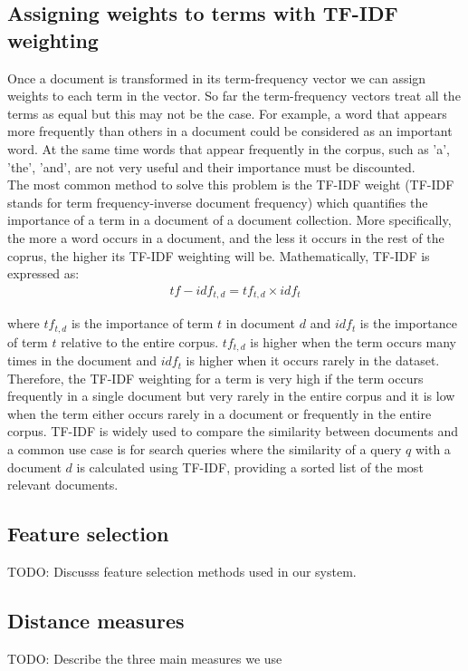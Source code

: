 \subsection{Assigning weights to terms with TF-IDF weighting}
Once a document is transformed in its term-frequency vector we can assign weights to each term in the vector. So far the term-frequency vectors treat 
all the terms as equal but this may not be the case. For example, a word that appears more frequently than others in a document could be considered as an 
important word. At the same time words that appear frequently in the corpus, such as 'a', 'the', 'and', are not very useful and their 
importance must be discounted. \\
The most common method to solve this problem is the TF-IDF weight (TF-IDF stands for term frequency-inverse document frequency) which quantifies the importance of a term in a document of a document collection. More specifically, the more a word occurs in a document, and the less it occurs in the rest of the coprus, the higher its TF-IDF weighting 
will be. Mathematically, TF-IDF is expressed as:\\
\begin{eqnarray}
tf-idf_{t,d} = tf_{t, d} \times idf_t
\end{eqnarray}

where $tf_{t, d}$ is the importance of term $t$ in document $d$ and $idf_t$ is the importance of term $t$ relative to the entire corpus. $tf_{t,d}$ is higher when the term occurs many times in the document and $idf_t$ is higher when it occurs rarely in the dataset. Therefore, the TF-IDF weighting for a term is very high if the term occurs frequently in a single document but very rarely in the entire corpus and it is low when the term either occurs rarely in a document or frequently in the entire corpus. TF-IDF is widely used to compare the similarity between documents and a common use case is for search queries where the similarity of a query $q$ with a document $d$ is calculated using TF-IDF, providing
a sorted list of the most relevant documents. 
\\
   
\subsection{Feature selection}
TODO: Discusss feature selection methods used in our system.

\subsection{Distance measures}
TODO: Describe the three main measures we use

